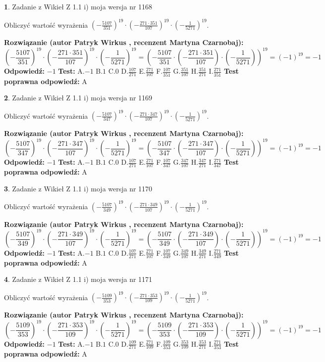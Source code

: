 \documentclass[12pt, a4paper]{article}
\theoremstyle{definition} %
\newtheorem{zad}{}
\newcommand{\zadStart}[1]{\begin{zad}#1\newline}
\newcommand{\zadStop}{\end{zad}}
\newcommand{\rozwStart}[2]{\noindent \textbf{Rozwiązanie (autor #1 , recenzent #2): }\newline}
\newcommand{\rozwStop}{\newline}
\newcommand{\odpStart}{\noindent \textbf{Odpowiedź:}\newline}
\newcommand{\odpStop}{\newline}
\newcommand{\testStart}{\noindent \textbf{Test:}\newline}
\newcommand{\testStop}{\newline}
\newcommand{\kluczStart}{\noindent \textbf{Test poprawna odpowiedź:}\newline}
\newcommand{\kluczStop}{\newline}
\begin{document}
\zadStart{Zadanie z Wikieł Z 1.1 i) moja wersja nr 1168}

Obliczyć wartość wyrażenia $(-\frac{5107}{351})^{19} \cdot (-\frac{271 \cdot 351}{107})^{19} \cdot (-\frac{1}{5271})^{19}$.
\zadStop
\rozwStart{Patryk Wirkus}{Martyna Czarnobaj}
$$(-\frac{5107}{351})^{19} \cdot (-\frac{271 \cdot 351}{107})^{19} \cdot (-\frac{1}{5271})^{19} = (-\frac{5107}{351} \cdot (-\frac{271 \cdot 351}{107}) \cdot (-\frac{1}{5271}))^{19} = (-1)^{19} = -1$$
\rozwStop
\odpStart
$-1$
\odpStop
\testStart
A.$-1$ B.$1$ C.$0$ D.$\frac{107}{271}$ E.$\frac{271}{107}$
F.$\frac{107}{351}$ G.$\frac{351}{107}$
H.$\frac{351}{271}$
I.$\frac{271}{351}$
\testStop
\kluczStart
A
\kluczStop



\zadStart{Zadanie z Wikieł Z 1.1 i) moja wersja nr 1169}

Obliczyć wartość wyrażenia $(-\frac{5107}{347})^{19} \cdot (-\frac{271 \cdot 347}{107})^{19} \cdot (-\frac{1}{5271})^{19}$.
\zadStop
\rozwStart{Patryk Wirkus}{Martyna Czarnobaj}
$$(-\frac{5107}{347})^{19} \cdot (-\frac{271 \cdot 347}{107})^{19} \cdot (-\frac{1}{5271})^{19} = (-\frac{5107}{347} \cdot (-\frac{271 \cdot 347}{107}) \cdot (-\frac{1}{5271}))^{19} = (-1)^{19} = -1$$
\rozwStop
\odpStart
$-1$
\odpStop
\testStart
A.$-1$ B.$1$ C.$0$ D.$\frac{107}{271}$ E.$\frac{271}{107}$
F.$\frac{107}{347}$ G.$\frac{347}{107}$
H.$\frac{347}{271}$
I.$\frac{271}{347}$
\testStop
\kluczStart
A
\kluczStop



\zadStart{Zadanie z Wikieł Z 1.1 i) moja wersja nr 1170}

Obliczyć wartość wyrażenia $(-\frac{5107}{349})^{19} \cdot (-\frac{271 \cdot 349}{107})^{19} \cdot (-\frac{1}{5271})^{19}$.
\zadStop
\rozwStart{Patryk Wirkus}{Martyna Czarnobaj}
$$(-\frac{5107}{349})^{19} \cdot (-\frac{271 \cdot 349}{107})^{19} \cdot (-\frac{1}{5271})^{19} = (-\frac{5107}{349} \cdot (-\frac{271 \cdot 349}{107}) \cdot (-\frac{1}{5271}))^{19} = (-1)^{19} = -1$$
\rozwStop
\odpStart
$-1$
\odpStop
\testStart
A.$-1$ B.$1$ C.$0$ D.$\frac{107}{271}$ E.$\frac{271}{107}$
F.$\frac{107}{349}$ G.$\frac{349}{107}$
H.$\frac{349}{271}$
I.$\frac{271}{349}$
\testStop
\kluczStart
A
\kluczStop



\zadStart{Zadanie z Wikieł Z 1.1 i) moja wersja nr 1171}

Obliczyć wartość wyrażenia $(-\frac{5109}{353})^{19} \cdot (-\frac{271 \cdot 353}{109})^{19} \cdot (-\frac{1}{5271})^{19}$.
\zadStop
\rozwStart{Patryk Wirkus}{Martyna Czarnobaj}
$$(-\frac{5109}{353})^{19} \cdot (-\frac{271 \cdot 353}{109})^{19} \cdot (-\frac{1}{5271})^{19} = (-\frac{5109}{353} \cdot (-\frac{271 \cdot 353}{109}) \cdot (-\frac{1}{5271}))^{19} = (-1)^{19} = -1$$
\rozwStop
\odpStart
$-1$
\odpStop
\testStart
A.$-1$ B.$1$ C.$0$ D.$\frac{109}{271}$ E.$\frac{271}{109}$
F.$\frac{109}{353}$ G.$\frac{353}{109}$
H.$\frac{353}{271}$
I.$\frac{271}{353}$
\testStop
\kluczStart
A
\kluczStop
\end{document}
